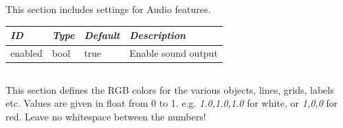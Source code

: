 \subsection{}

This section includes settings for Audio features.

\noindent%
\begin{longtable}{l|l|l|p{65mm}}
\toprule
\emph{ID}         & \emph{Type} & \emph{Default} & \emph{Description}\\\midrule
enabled           & bool        & true           & Enable sound output\\\bottomrule
\end{longtable}

\subsection{}

This section defines the RGB colors for the various objects, lines,
grids, labels etc. Values are given in float from 0 to
1. e.g. \emph{1.0,1.0,1.0} for white, or \emph{1,0,0} for red. Leave
no whitespace between the numbers!

